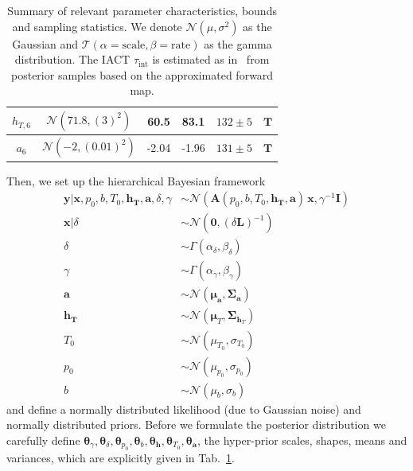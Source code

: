 \begin{table}
\begin{tabular}{ |c||c|c|c|c|c|   }
		$h_{T,6}$ &  $\mathcal{N}(71.8,(3)^2)$&60.5 &83.1&$132\pm 5$&$\bm{T}$\\ \hline
		$a_{6}$ & $\mathcal{N}(-2,(0.01)^2)$ &-2.04 &-1.96&$131\pm 5$&$\bm{T}$\\
		\hline
	\end{tabular}
	\caption[Summary of relevant parameter characteristics, bounds and sampling statistics.]{Summary of relevant parameter characteristics, bounds and sampling statistics. We denote $\mathcal{N}(\mu,\sigma^2)$ as the Gaussian and $\mathcal{T}(\alpha = \text{scale}, \beta = \text{rate})$ as the gamma distribution. The IACT $\tau_{\text{int}}$ is estimated as in~\cite{UwerrM} from posterior samples based on the approximated forward map.}
	\label{tab:priors}
\end{table}

Then, we set up the hierarchical Bayesian framework
\begin{subequations}
	\begin{align}
		\bm{y} |  \bm{x},p_0,b,T_0,\bm{h_T},\bm{a} ,\delta,\gamma  &\sim \mathcal{N}(\bm{A}(p_0,b,T_0,\bm{h_T},\bm{a}) \, \bm{x}, \gamma^{-1} \bm{I}) \label{eq:likelihoodFull} \\
		\bm{x}| \delta  &\sim \mathcal{N}(\bm{0}, (\delta \bm{L})^{-1} ) \label{eq:priorXFull} \\
		\delta  &\sim \Gamma(\alpha_{\delta} , \beta_{\delta} )\label{eq:priorDelFull} \\
		\gamma  &\sim \Gamma(\alpha_{\gamma}, \beta_{\gamma})\label{eq:priorGamFull} \\
		\bm{a}  &\sim \mathcal{N}(\bm{\mu}_{\bm{a}}, \bm{\Sigma}_{\bm{a}})\\
		\bm{h}_{\bm{T}}  &\sim \mathcal{N}(\bm{\mu}_{T}, \bm{\Sigma}_{\bm{h}_T}) \\
		T_0  &\sim \mathcal{N}(\mu_{T_0}, \sigma_{T_0} )\\
		p_0  &\sim \mathcal{N}(\mu_{p_0}, \sigma_{p_0} )\\
		b  &\sim \mathcal{N}(\mu_b, \sigma_b )
	\end{align}
	\label{eq:BayMode}
\end{subequations}
and define a normally distributed likelihood (due to Gaussian noise) and normally distributed priors.
Before we formulate the posterior distribution we carefully define $\bm{\theta}_{\gamma}, \bm{\theta}_{\delta},\bm{\theta}_{p_0},\bm{\theta}_{b},\bm{\theta}_{\bm{h}},\bm{\theta}_{T_0},\bm{\theta}_{\bm{a}}$, the hyper-prior scales, shapes, means and variances, which are explicitly given in Tab.~\ref{tab:priors}.

